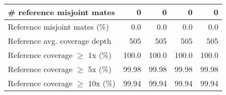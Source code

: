 \documentclass[12pt,a4paper]{article}
\begin{document}
\begin{table}[ht]
\begin{center}
\begin{tabular}{|l*{4}{|r}|}
\# reference misjoint mates & 0 & 0 & 0 & 0 \\ \hline
Reference misjoint mates (\%) & 0.0 & 0.0 & 0.0 & 0.0 \\ \hline
Reference avg. coverage depth & 505 & 505 & 505 & 505 \\ \hline
Reference coverage $\geq$ 1x (\%) & 100.0 & 100.0 & 100.0 & 100.0 \\ \hline
Reference coverage $\geq$ 5x (\%) & 99.98 & 99.98 & 99.98 & 99.98 \\ \hline
Reference coverage $\geq$ 10x (\%) & 99.94 & 99.94 & 99.94 & 99.94 \\ \hline
\end{tabular}
\end{center}
\end{table}
\end{document}
